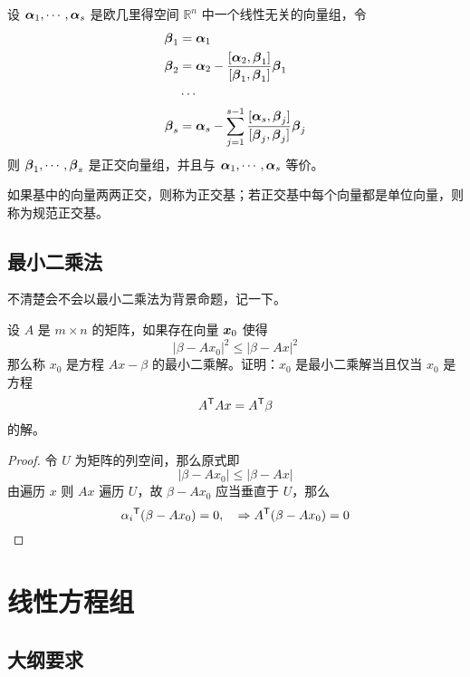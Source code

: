 \begin{theorem}
	设 $\boldsymbol{\alpha}_1,\cdots,\boldsymbol{\alpha}_s$ 是欧几里得空间 $\mathbb{R}^n$ 中一个线性无关的向量组，令
	\[
		\begin{aligned}
			\boldsymbol{\beta}_1 & =\boldsymbol{\alpha}_1                                                                                                    \\
			\boldsymbol{\beta}_2 & =\boldsymbol{\alpha}_2 - \frac{[\boldsymbol{\alpha}_2,\boldsymbol{\beta}_1]}{[\boldsymbol{\beta}_1,\boldsymbol{\beta}_1]}\boldsymbol{\beta}_1                \\
			              & \cdots                                                                                                             \\
			\boldsymbol{\beta}_s & = \boldsymbol{\alpha}_s-\sum_{j=1}^{s-1}\frac{[\boldsymbol{\alpha}_s,\boldsymbol{\beta}_j]}{[\boldsymbol{\beta}_j,\boldsymbol{\beta}_j]}\boldsymbol{\beta}_j
		\end{aligned}
	\]
	则 $\boldsymbol{\beta}_1,\cdots,\boldsymbol{\beta}_s$ 是正交向量组，并且与 $\boldsymbol{\alpha}_1,\cdots,\boldsymbol{\alpha}_s$ 等价。
\end{theorem}

如果基中的向量两两正交，则称为正交基；若正交基中每个向量都是单位向量，则称为规范正交基。

\subsection{最小二乘法}

不清楚会不会以最小二乘法为背景命题，记一下。

\begin{theorem}
	设 $A$ 是 $m \times n$ 的矩阵，如果存在向量 $\boldsymbol{x}_0$ 使得
	\[ |\beta - Ax_0|^2 \leqslant |\beta - Ax|^2 \]
	那么称 $x_0$ 是方程 $Ax-\beta$ 的最小二乘解。证明：$x_0$ 是最小二乘解当且仅当 $x_0$ 是方程
	\[ {A}^\mathsf{T}A x = {A}^\mathsf{T}\beta \]
	的解。
\end{theorem}

\begin{proof}
	令 $U$ 为矩阵的列空间，那么原式即
	\[ |\beta - Ax_0| \leqslant |\beta - Ax| \]
	由遍历 $x$ 则 $Ax$ 遍历 $U$，故 $\beta - A x_0$ 应当垂直于 $U$，那么
	\[ {\alpha_i}^\mathsf{T}(\beta - Ax_0) = 0, \quad  \Rightarrow {A}^\mathsf{T}(\beta - Ax_0) = 0 \]
\end{proof}

\section{线性方程组}

\subsection{大纲要求}

